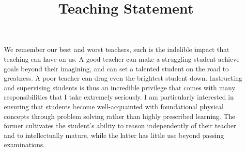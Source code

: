 \documentclass[11pt,letterpaper,sans]{moderncv} %
\title{\huge{Teaching Statement}}
\begin{document}
\makecvtitle %

\vspace{-3mm}

We remember our best and worst teachers, such is the indelible impact that teaching can have on us. A good teacher can make a struggling student achieve goals beyond their imagining, and can set a talented student on the road to greatness. A poor teacher can drag even the brightest student down. Instructing and supervising students is thus an incredible privilege that comes with many responsibilities that I take extremely seriously. %
I am particularly interested in ensuring that students become well-acquainted with foundational physical concepts through problem solving rather than highly prescribed learning. The former cultivates the student's ability to reason independently of their teacher and to intellectually mature, while the latter has little use beyond passing examinations. 
\vspace{2mm}

\end{document}
